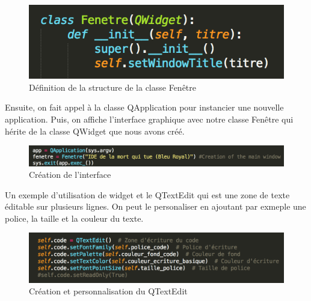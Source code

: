 \documentclass[a4paper,12pt]{article}
\begin{document}
		\begin{figure}[!h]

			\begin{center}

				\includegraphics[scale=0.8]{"images/QWidget"}

				\caption{Définition de la structure de la classe Fenêtre}
			\end{center}

		\end{figure}
		\newpage
		Ensuite, on fait appel à la classe QApplication pour instancier une nouvelle application. Puis, on affiche l'interface graphique avec notre classe Fenêtre qui hérite de la classe QWidget que nous avons créé. 

		\begin{figure}[!h]

			\begin{center}

				\includegraphics[scale=0.8]{"images/QApplication"}

				\caption{Création de l'interface}

			\end{center}

		\end{figure}

		Un exemple d'utilisation de widget et le QTextEdit qui est une zone de texte éditable sur plusieurs lignes. On peut le personaliser en ajoutant par exmeple une police, la taille et la couleur du texte.

		\begin{figure}[!h]

			\begin{center}

				\includegraphics[scale=0.8]{"images/QTextEdit"}

				\caption{Création et personnalisation du QTextEdit}
			\end{center}

		\end{figure}
\end{document}
